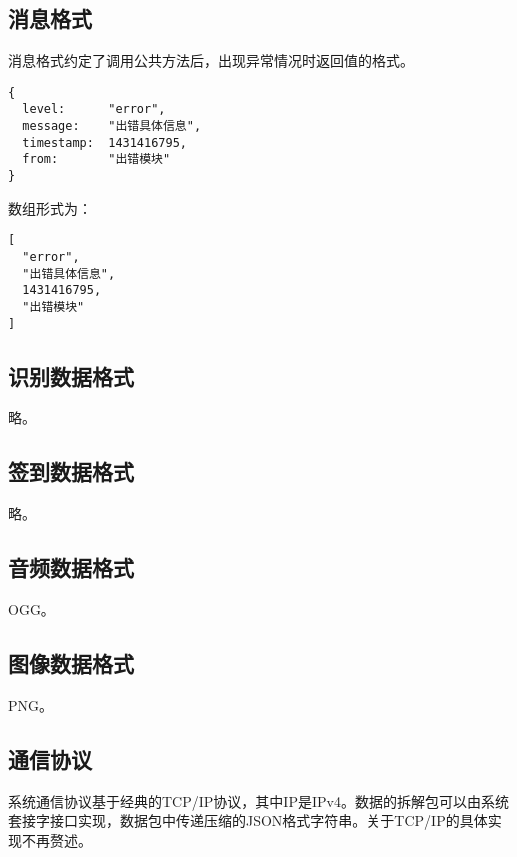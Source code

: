 \documentclass[cs4size,a4paper,nofonts]{ctexart}
\begin{document}
\subsection{消息格式}\label{sec:消息格式}

消息格式约定了调用公共方法后，出现异常情况时返回值的格式。

\begin{Verbatim}
{
  level:      "error",
  message:    "出错具体信息",
  timestamp:  1431416795,
  from:       "出错模块"
}
\end{Verbatim}

数组形式为：

\begin{Verbatim}
[
  "error",
  "出错具体信息",
  1431416795,
  "出错模块"
]
\end{Verbatim}

\subsection{识别数据格式}\label{sec:识别数据格式}

略。

\subsection{签到数据格式}\label{sec:签到数据格式}

略。

\subsection{音频数据格式}\label{sec:音频数据格式}

OGG。

\subsection{图像数据格式}\label{sec:图像数据格式}

PNG。

\subsection{通信协议}\label{sec:通信协议}

系统通信协议基于经典的TCP/IP协议，其中IP是IPv4。数据的拆解包可以由系统套接字接口实现，数据包中传递压缩的JSON格式字符串。关于TCP/IP的具体实现不再赘述。
\end{document}
